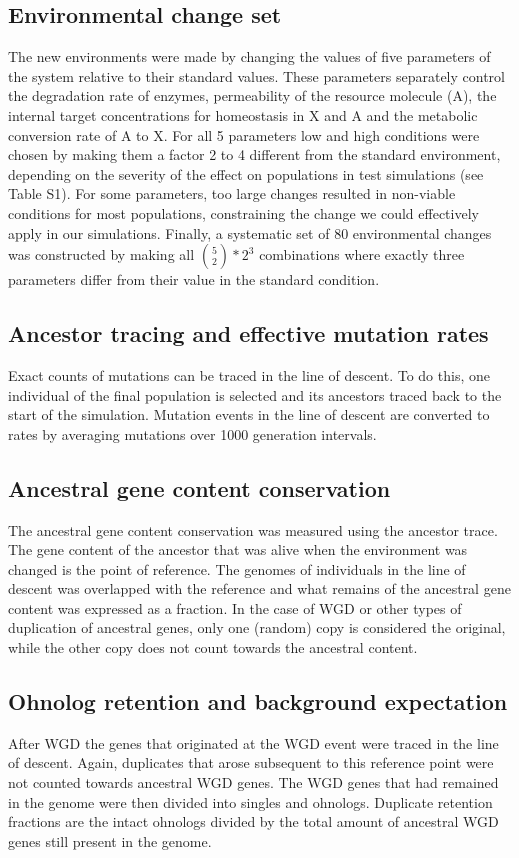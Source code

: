 \subsection{Environmental change set}
The new environments were made by changing the values of five parameters of the system relative to their standard values. These parameters separately control the degradation rate of enzymes, permeability of the resource molecule (A), the internal target concentrations for homeostasis in X and A and the metabolic conversion rate of A to X. For all 5 parameters low and high conditions were chosen by making them a factor 2 to 4 different from the standard environment, depending on the severity of the effect on populations in test simulations (see Table S1). For some parameters, too large changes resulted in non-viable conditions for most populations, constraining the change we could effectively apply in our simulations. Finally, a systematic set of 80 environmental changes was constructed by making all $\binom{5}{2}*2^{3} $ combinations where exactly three parameters differ from their value in the standard condition.

\subsection{Ancestor tracing and effective mutation rates}
Exact counts of mutations can be traced in the line of descent. To do this, one individual of the final population is selected and its ancestors traced back to the start of the simulation. Mutation events in the line of descent are converted to rates by averaging mutations over 1000 generation intervals.

\subsection{Ancestral gene content conservation}
The ancestral gene content conservation was measured using the ancestor trace. The gene content of the ancestor that was alive when the environment was changed is the point of reference. The genomes of individuals in the line of descent was overlapped with the reference and what remains of the ancestral gene content was expressed as a fraction. In the case of WGD or other types of duplication of ancestral genes, only one (random) copy is considered the original, while the other copy does not count towards the ancestral content.

\subsection{Ohnolog retention and background expectation}
After WGD the genes that originated at the WGD event were traced in the line of descent. Again, duplicates that arose subsequent to this reference point were not counted towards ancestral WGD genes. The WGD genes that had remained in the genome were then divided into singles and ohnologs. Duplicate retention fractions are the intact ohnologs divided by the total amount of ancestral WGD genes still present in the genome.

